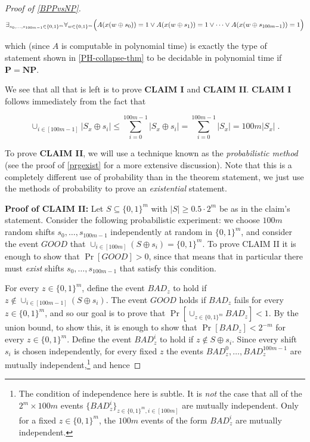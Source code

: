 \begin{proof}[Proof of \cref{BPPvsNP}]
\[
\exists_{s_0,\ldots, s_{100m-1} \in \{0,1\}^m} \forall_{w\in \{0,1\}^m} \Bigl( A(x(w\oplus s_0))=1 \vee A(x(w\oplus s_1))=1 \vee \cdots \vee A(x(w\oplus s_{100m-1}))=1    \Bigr)
\]

which (since \(A\) is computable in polynomial time) is exactly the type
of statement shown in \cref{PH-collapse-thm} to be decidable in
polynomial time if \(\mathbf{P}=\mathbf{NP}\).

We see that all that is left is to prove \textbf{CLAIM I} and
\textbf{CLAIM II}. \textbf{CLAIM I} follows immediately from the fact
that

\[
\cup_{i \in [100m-1]} |S_x \oplus s_i| \leq \sum_{i=0}^{100m-1} |S_x \oplus s_i| = \sum_{i=0}^{100m -1} |S_x| = 100m|S_x| \;.
\]

To prove \textbf{CLAIM II}, we will use a technique known as the
\emph{probabilistic method} (see the proof of \cref{prgexist} for a more
extensive discussion). Note that this is a completely different use of
probability than in the theorem statement, we just use the methods of
probability to prove an \emph{existential} statement.

\textbf{Proof of CLAIM II:} Let \(S \subseteq \{0,1\}^m\) with
\(|S| \geq 0.5 \cdot 2^m\) be as in the claim's statement. Consider the
following probabilistic experiment: we choose \(100m\) random shifts
\(s_0,\ldots,s_{100m-1}\) independently at random in \(\{0,1\}^m\), and
consider the event \(\ensuremath{\mathit{GOOD}}\) that
\(\cup_{i\in [100m]}(S \oplus s_i) = \{0,1\}^m\). To prove CLAIM II it
is enough to show that \(\Pr[ \ensuremath{\mathit{GOOD}} ] > 0\), since
that means that in particular there must \emph{exist} shifts
\(s_0,\ldots,s_{100m-1}\) that satisfy this condition.

For every \(z \in \{0,1\}^m\), define the event
\(\ensuremath{\mathit{BAD}}_z\) to hold if
\(z \not\in \cup_{i\in [100m-1]}(S \oplus s_i)\). The event
\(\ensuremath{\mathit{GOOD}}\) holds if \(\ensuremath{\mathit{BAD}}_z\)
fails for every \(z\in \{0,1\}^m\), and so our goal is to prove that
\(\Pr[ \cup_{z\in \{0,1\}^m} \ensuremath{\mathit{BAD}}_z ] <1\). By the
union bound, to show this, it is enough to show that
\(\Pr[ \ensuremath{\mathit{BAD}}_z ] < 2^{-m}\) for every
\(z\in \{0,1\}^m\). Define the event \(\ensuremath{\mathit{BAD}}_z^i\)
to hold if \(z\not\in S \oplus s_i\). Since every shift \(s_i\) is
chosen independently, for every fixed \(z\) the events
\(\ensuremath{\mathit{BAD}}_z^0,\ldots,\ensuremath{\mathit{BAD}}_z^{100m-1}\)
are mutually independent,\footnote{The condition of independence here is
  subtle. It is \emph{not} the case that all of the \(2^m \times 100m\)
  events
  \(\{ \ensuremath{\mathit{BAD}}_z^i \}_{z\in \{0,1\}^m,i\in [100m]}\)
  are mutually independent. Only for a fixed \(z \in \{0,1\}^m\), the
  \(100m\) events of the form \(\ensuremath{\mathit{BAD}}_z^i\) are
  mutually independent.} and hence


\end{proof}
